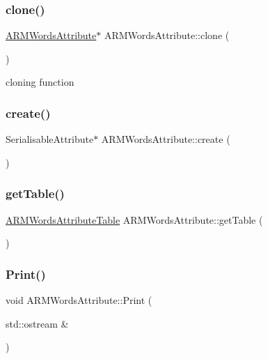 \subsubsection{\texorpdfstring{clone()}{clone()}}
{\footnotesize\ttfamily \hyperlink{classARMWordsAttribute}{A\+R\+M\+Words\+Attribute}$\ast$ A\+R\+M\+Words\+Attribute\+::clone (\begin{DoxyParamCaption}{ }\end{DoxyParamCaption})}

cloning function \mbox{\label{classARMWordsAttribute_a5989e2a2f17a9e9bfdcd76c0543e0720}} 
\subsubsection{\texorpdfstring{create()}{create()}}
{\footnotesize\ttfamily Serialisable\+Attribute$\ast$ A\+R\+M\+Words\+Attribute\+::create (\begin{DoxyParamCaption}{ }\end{DoxyParamCaption})}

\mbox{\label{classARMWordsAttribute_a6326d1ca018bc249d6dc28713af800a0}} 
\subsubsection{\texorpdfstring{get\+Table()}{getTable()}}
{\footnotesize\ttfamily \hyperlink{ARMWordsAttribute_8h_a7d589468d1898466a80161546d217fd6}{A\+R\+M\+Words\+Attribute\+Table} A\+R\+M\+Words\+Attribute\+::get\+Table (\begin{DoxyParamCaption}{ }\end{DoxyParamCaption})}

\mbox{\label{classARMWordsAttribute_a6875eb117a936a45fbb6e90e3a2ecad9}} 
\subsubsection{\texorpdfstring{Print()}{Print()}}
{\footnotesize\ttfamily void A\+R\+M\+Words\+Attribute\+::\+Print (\begin{DoxyParamCaption}\item[{std\+::ostream \&}]{ }\end{DoxyParamCaption})}

